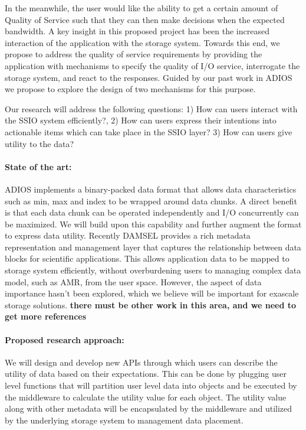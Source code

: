 In the meanwhile, the user would like the ability to get a certain amount of Quality of Service 
such that they can then make decisions when the expected bandwidth.
A key insight in this proposed project has been the increased interaction of
the application with the storage system. Towards this end, we propose to
address the quality of service requirements by providing the application
with mechanisms to specify the quality of I/O service, interrogate the
storage system, and react to the responses. Guided by our past work in
ADIOS \cite{lofstead2008flexible} we propose to explore the design of two
mechanisms for this purpose. 

Our research will address the following questions: 1) How can users interact with the SSIO system efficiently?,
2) How can users express their intentions into actionable items which can take place in the SSIO layer?
3) How can users give utility to the data?


\paragraph{State of the art:} ADIOS implements a binary-packed data format that allows
data characteristics such as min, max and index to be wrapped around data chunks. A
direct benefit is that each data chunk can be operated independently and I/O concurrently
can be maximized. We will build upon this capability and further augment the format
to express data utility. Recently DAMSEL \cite{damsel} provides a rich metadata representation
and management layer that captures the relationship between data blocks for scientific applications.
This allows application data to be mapped to storage system efficiently, without overburdening
users to managing complex data model, such as AMR, from the user space. However, the aspect of 
data importance hasn't been explored, which we believe will be important for exascale storage solutions. 
{\color{red}\bf there must be other work in this area, and we need to get more references}

\paragraph{Proposed research approach:} 
We will design and develop new APIs through which users can describe the utility of data
based on their expectations. This can be done by plugging user level functions that will
partition user level data into objects and be executed by the middleware to calculate the 
utility value for each object. The utility value along with other metadata will be encapsulated
by the middleware and utilized by the underlying storage system to management data placement.
%

